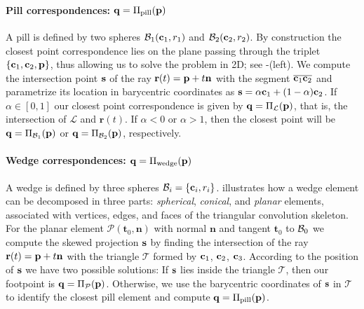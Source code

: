 \paragraph{Pill correspondences: $\mathbf{q}=\Pi_\text{pill}(\mathbf{p})$}
A pill is defined by two spheres $\mathcal{B}_1(\mathbf{c}_1,r_1)$ and $\mathcal{B}_2(\mathbf{c}_2,r_2)$. By construction the closest point correspondence lies on the plane passing through the triplet $\{ \mathbf{c}_1, \mathbf{c}_2, \mathbf{p} \}$, thus allowing us to solve the problem in 2D; see -(left). 
% 
We compute the intersection point $\mathbf{s}$ of the ray $\mathbf{r}(t) = \mathbf{p} + t\mathbf{n}$ with the segment $\overline{\mathbf{c}_1 \mathbf{c}_2}$ and parametrize its location in barycentric coordinates as $\mathbf{s} = \alpha\mathbf{c}_1 + (1-\alpha)\mathbf{c}_2$. If $\alpha \in [0,1]$ our closest point correspondence is given by $\mathbf{q}=\Pi_\mathcal{L}(\mathbf{p})$, that is, the intersection of $\mathcal{L}$ and $\mathbf{r}(t)$.  If $\alpha<0$ or $\alpha>1$, then the closest point will be $\mathbf{q}=\Pi_{\mathcal{B}_1}(\mathbf{p})$ or $\mathbf{q}=\Pi_{\mathcal{B}_2}(\mathbf{p})$, respectively. 

\paragraph{Wedge correspondences: $\mathbf{q}=\Pi_\text{wedge}(\mathbf{p})$}
A wedge is defined by three spheres $\mathcal{B}_i = \{\mathbf{c}_i, r_i\}$.   illustrates how a wedge element can be decomposed in three parts: \emph{spherical}, \emph{conical}, and \emph{planar} elements, associated with vertices, edges, and faces of the triangular convolution skeleton. For the planar element $\mathcal{P}(\mathbf{t}_0,\mathbf{n})$ with normal $\mathbf{n}$ and tangent $\mathbf{t}_0$ to $\mathcal{B}_0$
%
we compute the skewed projection $\mathbf{s}$ by finding the intersection of the ray $\mathbf{r}(t) = \mathbf{p} + t\mathbf{n}$ with the triangle $\mathcal{T}$ formed by $\mathbf{c}_1$, $\mathbf{c}_2$, $\mathbf{c}_3$. 
% 
According to the position of $\mathbf{s}$ we have two possible solutions:
If $\mathbf{s}$ lies inside the triangle $\mathcal{T}$, then our footpoint is $\mathbf{q} = \Pi_\mathcal{P}(\mathbf{p})$. Otherwise, we use the barycentric coordinates of $\mathbf{s}$ in $\mathcal{T}$ to identify the closest pill element and compute $\mathbf{q}=\Pi_\text{pill}(\mathbf{p})$.

